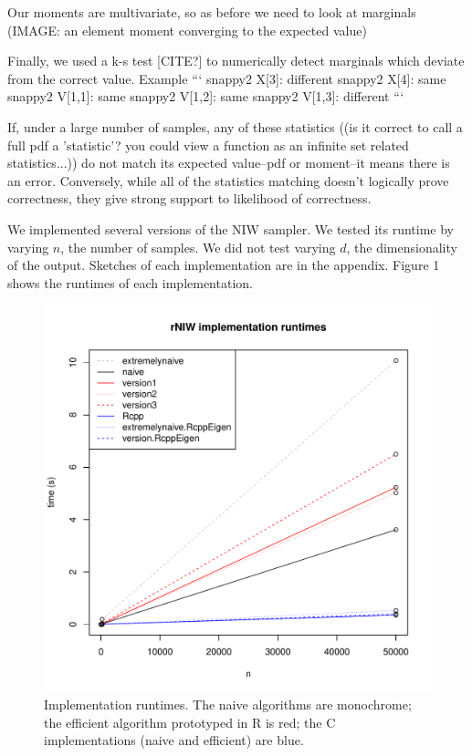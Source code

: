 \documentclass[english]{report}
\begin{document}
Our moments are multivariate, so as before we need to look at marginals 
(IMAGE: an element moment converging to the expected value)

Finally, we used a k-s test [CITE?] to numerically detect marginals which deviate from the correct value. Example 
```
snappy2 X[3]: different
snappy2 X[4]: same
snappy2 V[1,1]: same
snappy2 V[1,2]: same
snappy2 V[1,3]: different
```


If, under a large number of samples, any of these statistics ((is it correct to call a full pdf a 'statistic'? you could view a function as an infinite set related statistics...)) do not match its expected value--pdf or moment--it means there is an error. Conversely, while all of the statistics matching doesn't logically prove correctness, they give strong support to likelihood of correctness.





We implemented several versions of the NIW sampler. We tested its runtime by varying $n$, the number of samples. We did not test varying $d$, the dimensionality of the output. Sketches of each implementation are in the appendix. Figure 1 shows the runtimes of each implementation.

\begin{figure}[hbtp]
\centering
\includegraphics[scale=.5]{runtimes.pdf}
\caption{Implementation runtimes. The naive algorithms are monochrome; the efficient algorithm prototyped in R is red; the C implementations (naive and efficient) are blue.}
\end{figure}
\end{document}
